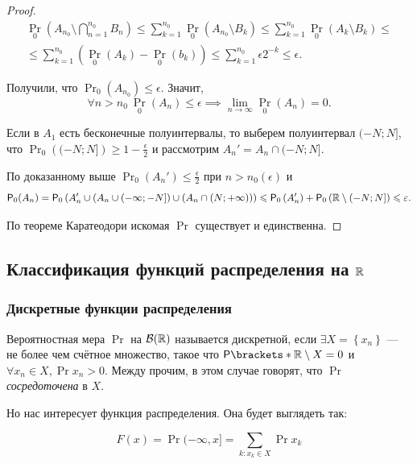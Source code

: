 \begin{proof}
	\begin{multline*} 
	\Pr_0\left(A_{n_0} \setminus \bigcap\limits_{n=1}^{n_0}B_n\right)
	\leq \sum\limits_{k=1}^{n_0}\Pr_0\left(A_{n_0} \setminus B_k \right) \leq \sum\limits_{k=1}^{n_0} \Pr_0\left(A_k \setminus B_k \right) \leq \\ \leq
	\sum\limits_{k=1}^{n_0} \left( \Pr_0\left(A_k\right) - \Pr_0\left(b_k\right) \right) \leq 
	\sum\limits_{k=1}^{n_0}\epsilon2^{-k} \leq \epsilon.
	\end{multline*}
	
	Получили, что \(\Pr_0(A_{n_0}) \leq \epsilon\). Значит, 
	\[
	\forall n > n_0 \ \Pr_0(A_n) \leq \epsilon \implies  \lim\limits_{n \to \infty}\Pr_0(A_n) = 0.
	\]
	
	Если в $ A_1 $ есть бесконечные полуинтервалы, то выберем полуинтервал $ (-N; N] $, что \(\Pr_0\left((-N; N] \right) \geq 1 - \frac{\epsilon}{2}\) и рассмотрим \(A_n' = A_n \cap (-N; N].  \)
	
	По доказанному выше \(\Pr_0(A_n') \leq \frac{\epsilon}{2} \) при $ n > n_0(\epsilon) $ и 
	\[
	\Pr_0(A_n) = \Pr_0\left(A_n' \cup \left(A_n \cup (-\infty; -N] \right) \cup \left(A_n \cap (N; +\infty)  \right)  \right) \leq \Pr_0\left(A_n'\right) + \Pr_0\left(\R \setminus (-N; N] \right) \leq \epsilon.
	\]
	
	По теореме Каратеодори искомая $ \Pr $ существует и единственна.
\end{proof}

\subsection{Классификация функций распределения на $\mathbb{R}$}

\subsubsection{Дискретные функции распределения}

    Вероятностная мера $\Pr$ на $\mathcal{B}(\mathbb{R})$ называется дискретной, если $\exists X = \left\{ x_n
    \right\}$ --- не более чем счётное множество, такое что $\Pr{\R \setminus X} = 0$ и $\forall x_n \in X,
    \Pr{x_n} > 0$. Между прочим, в этом случае говорят, что $\Pr$ \emph{сосредоточена} в $X$.

    Но нас интересует функция распределения. Она будет выглядеть так:

    \[
        F(x) = \Pr{(-\infty, x]} = \sum\limits_{k: x_k \in X} \Pr{x_k}
    \]

